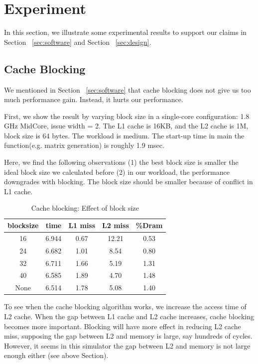 \documentclass[twocolumn,letterpaper,10pt]{article}
\begin{document}
\section{Experiment}
\label{sec:exp}
In this section, we illustrate some experimental results to support
our claims in Section ~\ref{sec:software} and Section ~\ref{sec:design}.
 
\subsection{Cache Blocking}
We mentioned in Section ~\ref{sec:software} that cache blocking does not give us
too much performance gain. Instead, it hurts our performance.

First, we show the result by varying block size in a
single-core configuration: 1.8 GHz MidCore, issue width = 2. The L1
cache is 16KB, and the L2 cache is 1M, block size is 64 bytes. The
workload is medium. The start-up time in main the function(e.g. matrix
generation) is roughly 1.9 msec.

Here, we find the following observations (1) the best block size is
smaller the ideal block size we calculated before (2) in our workload,
the performance downgrades with blocking. The block size should be
smaller because of conflict in L1 cache.

\begin{table}[ht!]
\begin{center}
\begin{tabular}{ccccc}
\toprule
blocksize & time & L1 miss & L2 miss & \%Dram \\
\midrule
16 & 6.944 & 0.67	 & 12.21	& 0.53 \\
24 & 6.682 &  1.01 &	8.54	& 0.80 \\ 
32 & 6.711 & 1.66	 & 5.19	& 1.31 \\ 
40 & 6.585 &  1.89 & 4.70	& 1.48 \\ 
None	& 6.514	& 1.78 & 5.08	& 1.40 \\
\bottomrule
\end{tabular}
\end{center}
\label{fig:blocking}
\caption{Cache blocking: Effect of block size}
\end{table}

To see when the cache blocking algorithm works, we increase the
access time of L2 cache. When the gap between L1 cache and L2 cache increases, 
cache blocking becomes more important. Blocking will have more effect
in reducing L2 cache miss, supposing the gap between L2 and memory is
large, say hundreds of cycles. However, it seems in this simulator the
gap between L2 and memory is not large enough either (see above Section).
\end{document}
